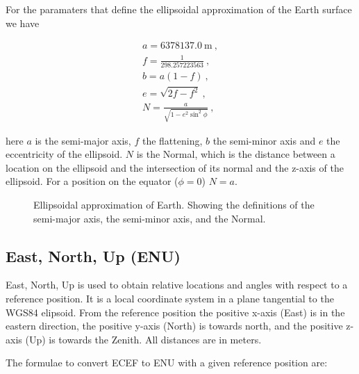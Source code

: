 \noindent
For the paramaters that define the ellipsoidal approximation of the
Earth surface we have

\begin{equation}
    \label{eq:wgs84}
    \begin{array}{l}
        a = \SI{6378137.0}{\meter} \ , \\
        f = \frac{1}{298.257223563} \ , \\
        b = a (1 - f) \ , \\
        e = \sqrt{2 f - f^2} \ , \\
        N = \frac{a}{\sqrt{1 - e^2 \sin^2 \phi}} \ ,
    \end{array}
\end{equation}

\noindent here $a$ is the semi-major axis, $f$ the flattening, $b$ the
semi-minor axis and $e$ the eccentricity of the ellipsoid. $N$ is the
Normal, which is the distance between a location on the ellipsoid and
the intersection of its normal and the z-axis of the ellipsoid. For a
position on the equator ($\phi = 0$) $N = a$.

\begin{figure}
    \centering
    
    \caption{Ellipsoidal approximation of Earth. Showing the definitions
             of the semi-major axis, the semi-minor axis, and the Normal.}
    \label{fig:ellipsoid}
\end{figure}


\subsection{East, North, Up (ENU)}

East, North, Up is used to obtain relative locations and angles with
respect to a reference position. It is a local coordinate system in a
plane tangential to the WGS84 elipsoid. From the reference position the
positive x-axis (East) is in the eastern direction, the positive y-axis
(North) is towards north, and the positive z-axis (Up) is towards the
Zenith. All distances are in meters.

The formulae to convert ECEF to ENU with a given reference position are:


